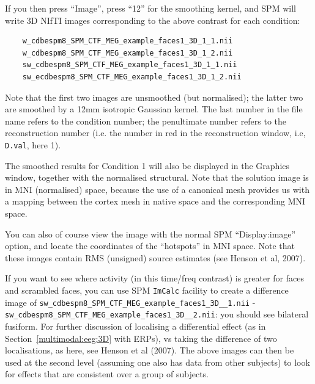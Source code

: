 If you then press ``Image'', press ``12'' for the smoothing kernel, and SPM will write 3D NIfTI images corresponding to the above contrast for each condition:

\begin{verbatim}
    w_cdbespm8_SPM_CTF_MEG_example_faces1_3D_1_1.nii
    w_cdbespm8_SPM_CTF_MEG_example_faces1_3D_1_2.nii
    sw_cdbespm8_SPM_CTF_MEG_example_faces1_3D_1_1.nii
    sw_ecdbespm8_SPM_CTF_MEG_example_faces1_3D_1_2.nii
\end{verbatim}

Note that the first two images are unsmoothed (but normalised); the latter two are smoothed by a 12mm isotropic Gaussian kernel. The last number in the file name refers to the condition number; the penultimate number refers to the reconstruction number (i.e. the number in red in the reconstruction window, i.e, \texttt{D.val}, here 1).

The smoothed results for Condition 1 will also be displayed in the Graphics window, together with the normalised structural. Note that the solution image is in MNI (normalised) space, because the use of a canonical mesh provides us with a mapping between the cortex mesh in native space and the corresponding MNI space.

You can also of course view the image with the normal SPM ``Display:image'' option, and locate the coordinates of the ``hotspots'' in MNI space. Note that these images contain RMS (unsigned) source estimates (see Henson et al, 2007).

If you want to see where activity (in this time/freq contrast) is greater for faces and scrambled faces, you can use SPM \texttt{ImCalc} facility to create a difference image of \texttt{sw\_\-cdbespm8\_\-SPM\_\-CTF\_\-MEG\_\-example\_\-faces1\_\-3D\_\_\-1.nii} - \texttt{sw\_\-cdbespm8\_\-SPM\_\-CTF\_\-MEG\_\-example\_\-faces1\_\-3D\_\_\-2.nii}: you should see bilateral fusiform. For further discussion of localising a differential effect (as in Section~\ref{multimodal:eeg:3D} with ERPs), vs taking the difference of two localisations, as here, see Henson et al (2007). The above images can then be used at the second level (assuming one also has data from other subjects) to look for effects that are consistent over a group of subjects.

